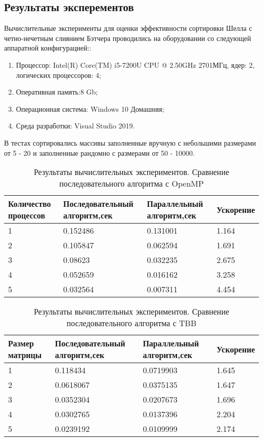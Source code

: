 \documentclass{report}
\begin{document}
\begin{center}
\section*{Результаты эксперементов}
\end{center}
\par Вычислительные эксперименты для оценки эффективности сортировки Шелла с четно-нечетным слиянием Бэтчера проводились на оборудовании со следующей аппаратной конфигурацией::
\begin{enumerate}
\item Процессор: Intel(R) Core(TM) i5-7200U CPU @ 2.50GHz 2701МГц, ядер: 2, логических процессоров: 4;
\item Оперативная память:8 Gb;
\item Операционная система: Windows 10 Домашняя;
\item Среда разработки: Visual Studio 2019.
\end{enumerate}
В тестах сортировались массивы заполненные вручную с небольшими размерами от 5 - 20 и заполненные рандомно с размерами от 50 - 10000.
\begin{table}[!h]
\caption{Результаты вычислительных экспериментов. Сравнение последовательного алгоритма с OpenMP}
\centering
\begin{tabular}{|p{4cm}|p{4cm}|p{4cm}|p{3cm}|}
\hline
Количество процессов & Последовательный алгоритм,сек & Параллельный алгоритм,сек & Ускорение  \\\hline
1  & 0.152486 & 0.131001 & 1.164  \\\hline
2  & 0.105847 & 0.062594 & 1.691  \\\hline
3  & 0.08623 & 0.032235 & 2.675  \\\hline
4  & 0.052659 & 0.016162 & 3.258  \\\hline
5  & 0.032564 & 0.007311 & 4.454  \\
\hline
\end{tabular}
\end{table}

\begin{table}[!h]
\caption{Результаты вычислительных экспериментов. Сравнение последовательного алгоритма с TBB}
\centering
\begin{tabular}{|p{4cm}|p{4cm}|p{4cm}|p{3cm}|}
\hline
Размер матрицы & Последовательный алгоритм,сек & Параллельный алгоритм,сек & Ускорение  \\\hline
1  & 0.118434 & 0.0719903 & 1.645  \\\hline
2  & 0.0618067 & 0.0375135 & 1.647  \\\hline
3  & 0.0352304 & 0.0207673 & 1.696  \\\hline
4  & 0.0302765 & 0.0137396 & 2.204  \\\hline
5  & 0.0239192 & 0.0109999 & 2.174  \\
\hline
\end{tabular}
\end{table}
\end{document}
